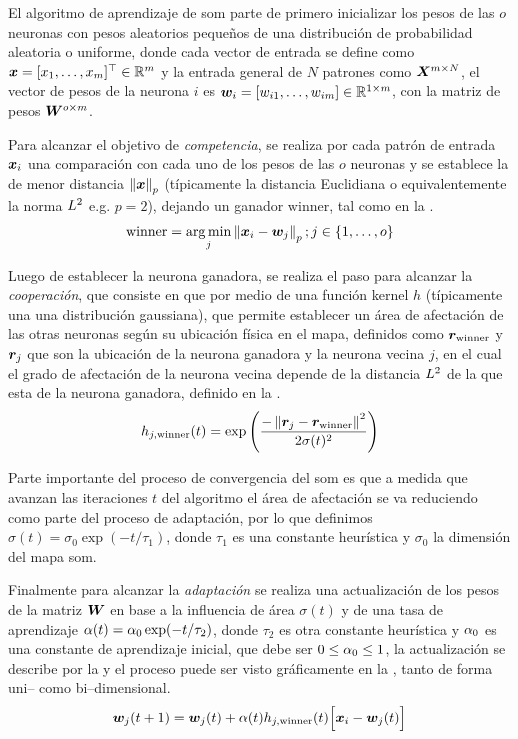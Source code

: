 El algoritmo de aprendizaje de \gls{som} parte de primero inicializar los pesos de las $o$ neuronas con pesos aleatorios pequeños de una distribución de probabilidad aleatoria o uniforme, donde cada vector de entrada se define como ${\bm{x}} = [x_1, \ldots, x_m]^{\top} \in \mathbb{R}^{m}$ y la entrada general de $N$ patrones como ${\bm{X}}^{m \times N}$, el vector de pesos de la neurona $i$ es ${\bm{w}}_i = [w_{i1}, \ldots, w_{im}] \in \mathbb{R}^{1 \times m}$, con la matriz de pesos ${\bm{W}}^{o \times m}$.

Para alcanzar el objetivo de \emph{competencia}, se realiza por cada patrón de entrada ${\bm{x}}_i$ una comparación con cada uno de los pesos de las $o$ neuronas y se establece la de menor distancia $\left\lVert{\bm{x}}\right\rVert_p$ (típicamente la distancia Euclidiana o equivalentemente la norma $L^2$ e.g. $p = 2$), dejando un ganador $\mathrm{winner}$, tal como en la .
\begin{equation} \label{eq:som-competition}
  \mathrm{winner} = \operatorname*{arg\,min}_j \left\lVert{\bm{x}}_i - {\bm{w}}_j\right\rVert_p ; j \in \{1, \ldots, o \}
\end{equation}

Luego de establecer la neurona ganadora, se realiza el paso para alcanzar la \emph{cooperación}, que consiste en que por medio de una función kernel $h$ (típicamente una una distribución gaussiana), que permite establecer un área de afectación de las otras neuronas según su ubicación física en el mapa, definidos como ${\bm{r}}_{\mathrm{winner}}$ y ${\bm{r}}_j$ que son la ubicación de la neurona ganadora y la neurona vecina $j$, en el cual el grado de afectación de la neurona vecina depende de la distancia $L^2$ de la que esta de la neurona ganadora, definido en la .
\begin{equation} \label{eq:som-cooperation}
  h_{j, \mathrm{winner}}(t) = \exp\Bigg(\frac{- \left\lVert{\bm{r}}_j - {\bm{r}}_{\mathrm{winner}}\right\rVert^2}{ 2 \sigma(t)^2}\Bigg)
\end{equation}

Parte importante del proceso de convergencia del \gls{som} es que a medida que avanzan las iteraciones $t$ del algoritmo el área de afectación se va reduciendo como parte del proceso de adaptación, por lo que definimos $\sigma(t) = \sigma_0 \exp(-t / \tau_1)$, donde $\tau_1$ es una constante heurística y $\sigma_0$ la dimensión del mapa \gls{som}.

Finalmente para alcanzar la \emph{adaptación} se realiza una actualización de los pesos de la matriz ${\bm{W}}$ en base a la influencia de área $\sigma(t)$ y de una tasa de aprendizaje $\alpha(t) = \alpha_0 \exp(-t/ \tau_2)$, donde $\tau_2$ es otra constante heurística y $\alpha_0$ es una constante de aprendizaje inicial, que debe ser $0 \le \alpha_0 \le 1$, la actualización se describe por la  y el proceso puede ser visto gráficamente en la , tanto de forma uni-- como bi--dimensional.
\begin{equation} \label{eq:som-adaptation}
  {\bm{w}}_j(t+1) = {\bm{w}}_j(t) + \alpha(t) h_{j, \mathrm{winner}}(t)\Big[{\bm{x}}_i-{\bm{w}}_j(t)\Big]
\end{equation}

